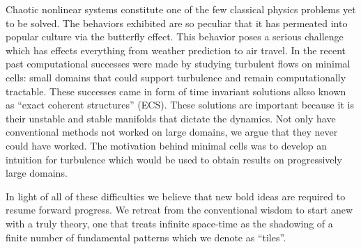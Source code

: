 
Chaotic nonlinear systems constitute one of the few classical
physics problems yet to be solved. The behaviors exhibited are so peculiar
that it has permeated into popular culture via the butterfly effect.
This behavior poses a serious challenge which has
effects everything from weather prediction to
air travel.
In the recent past computational successes were made
by studying turbulent flows on minimal cells: small domains that
could support turbulence and remain computationally tractable.
These successes came in form of time invariant solutions
alkso known as ``exact coherent structures''
(ECS). These solutions are important because it
is their unstable and stable manifolds that dictate the dynamics.
Not only have conventional methods not worked on large domains, we argue that
they never could have worked. The motivation behind minimal cells was to
develop an intuition for turbulence which would be used to obtain results
on progressively large domains.

In light of all of these difficulties
we believe that new bold ideas are required to resume forward progress.
We retreat from the conventional wisdom to start anew with a truly
{\spt} theory, one that treats infinite space-time as the shadowing
of a finite number of fundamental patterns which we denote as ``tiles''.


